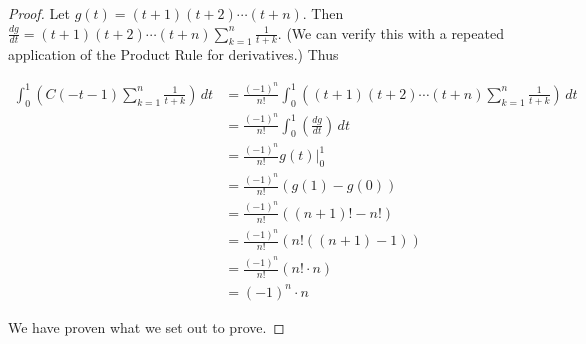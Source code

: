 \begin{proof}
Let $g(t) = (t + 1)(t + 2) \cdots (t + n)$. Then $\displaystyle \frac{dg}{dt} = (t + 1)(t + 2)\cdots(t + n) \sum_{k=1}^{n} \frac{1}{t + k}$. (We can verify this with a repeated application of the Product Rule for derivatives.) Thus

\begin{align*}
\int_0^1 \left(C(-t - 1) \sum_{k=1}^{n} \frac{1}{t + k} \right) \, dt 
&= \frac{(-1)^n}{n!} \int_0^1 \left( (t + 1)(t + 2)\cdots(t + n) \sum_{k=1}^{n} \frac{1}{t + k} \right) \, dt \\
&= \frac{(-1)^n}{n!} \int_0^1 \left( \frac{dg}{dt} \right) \, dt \\
&= \frac{(-1)^n}{n!} g(t) \Bigg|_0^1 \\
&= \frac{(-1)^n}{n!} (g(1) - g(0)) \\
&= \frac{(-1)^n}{n!} ((n+1)! - n!) \\
&= \frac{(-1)^n}{n!} (n! ((n + 1) - 1)) \\
&= \frac{(-1)^n}{n!} (n! \cdot n) \\
&= (-1)^n \cdot n
\end{align*}

We have proven what we set out to prove.
\end{proof}
